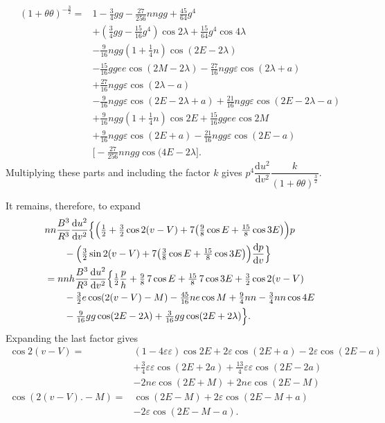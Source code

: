 \clearpage
\begingroup
{}
\renewcommand{\headrulewidth}{0pt}
\[
\begin{aligned}
(1+\theta\theta)^{-\frac32}
={}&1-\tfrac34gg-\tfrac{27}{256}nngg+\tfrac{45}{64}g^4\\
&+(\tfrac34gg-\tfrac{15}{16}g^4)\cos2\lambda
 +\tfrac{15}{64}g^4\cos4\lambda\\
&-\tfrac{9}{16}ngg(1+\tfrac14n)\cos(2E-2\lambda)\\
&-\tfrac{15}{16}ggee\cos(2M-2\lambda)
 -\tfrac{27}{16}ngg\varepsilon\cos(2\lambda+a)\\
&+\tfrac{27}{16}ngg\varepsilon\cos(2\lambda-a)\\
&-\tfrac{9}{16}ngg\varepsilon\cos(2E-2\lambda+a)
 +\tfrac{21}{16}ngg\varepsilon\cos(2E-2\lambda-a)\\
&+\tfrac{9}{16}ngg(1+\tfrac14n)\cos2E
 +\tfrac{15}{16}ggee\cos2M\\
&+\tfrac{9}{16}ngg\varepsilon\cos(2E+a)
 -\tfrac{21}{16}ngg\varepsilon\cos(2E-a)\\
&\bigl[-\tfrac{27}{256}nngg\cos(4E-2\lambda\bigr].
\end{aligned}
\]
\noindent Multiplying these parts and including the factor \(k\) gives
\(p^4\dfrac{\mathrm du^2}{\mathrm dv^2}\dfrac{k}{(1+\theta\theta)^{\frac32}}\).
\par\noindent\hspace*{\parindent}It remains, therefore, to expand
\[
\begin{aligned}
&nn\frac{B^3}{R^3}\frac{\mathrm du^2}{\mathrm dv^2}
 \Bigl\{\Bigl(\tfrac12+\tfrac32\cos2(v-V)
 +7\bigl(\tfrac98\cos E+\tfrac{15}{8}\cos3E\bigr)\Bigr)p\\
&\qquad-\Bigl(\tfrac32\sin2(v-V)
 +7\bigl(\tfrac38\cos E+\tfrac{15}{8}\cos3E\bigr)\Bigr)
 \frac{\mathrm dp}{\mathrm dv}\Bigr\}\\
&=nnh\frac{B^3}{R^3}\frac{\mathrm du^2}{\mathrm dv^2}
 \Bigl\{\tfrac12\frac{p}{h}+\tfrac98\,7\cos E+\tfrac{15}{8}\,7\cos3E
 +\tfrac32\cos2(v-V)\\
&\qquad-\tfrac32e\cos(2(v-V)-M)-\tfrac{45}{16}ne\cos M
 +\tfrac94nn-\tfrac34nn\cos4E\\
&\qquad-\tfrac{9}{16}gg\cos(2E-2\lambda)
 +\tfrac{3}{16}gg\cos(2E+2\lambda)\Bigr\}.
\end{aligned}
\]
\noindent Expanding the last factor gives
\[
\begin{aligned}
\cos2(v-V)
={}&(1-4\varepsilon\varepsilon)\cos2E
 +2\varepsilon\cos(2E+a)-2\varepsilon\cos(2E-a)\\
&+\tfrac34\varepsilon\varepsilon\cos(2E+2a)
 +\tfrac{13}{4}\varepsilon\varepsilon\cos(2E-2a)\\
&-2ne\cos(2E+M)+2ne\cos(2E-M)\\
\cos(2(v-V)\mathord{.}-M)
={}&\cos(2E-M)+2\varepsilon\cos(2E-M+a)\\
&-2\varepsilon\cos(2E-M-a).
\end{aligned}
\]
